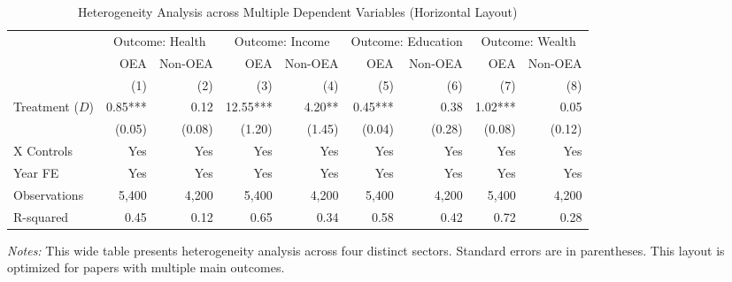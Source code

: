 \documentclass{article}
\begin{document}
\begin{landscape}
\begin{table}[htbp]
    \centering
    \begin{threeparttable}
    \caption{Heterogeneity Analysis across Multiple Dependent Variables (Horizontal Layout)}
    \label{tab:wide_results}
    \begin{tabular}{l r r r r r r r r}
        \toprule
        & \multicolumn{2}{c}{Outcome: Health} & \multicolumn{2}{c}{Outcome: Income} & \multicolumn{2}{c}{Outcome: Education} & \multicolumn{2}{c}{Outcome: Wealth} \\
        \cmidrule(lr){2-3} \cmidrule(lr){4-5} \cmidrule(lr){6-7} \cmidrule(lr){8-9}
        & {OEA} & {Non-OEA} & {OEA} & {Non-OEA} & {OEA} & {Non-OEA} & {OEA} & {Non-OEA} \\
        & {(1)} & {(2)} & {(3)} & {(4)} & {(5)} & {(6)} & {(7)} & {(8)} \\
        \midrule
        Treatment ($D$) & 0.85*** & 0.12 & 12.55*** & 4.20** & 0.45*** & 0.38 & 1.02*** & 0.05 \\
                        & (0.05) & (0.08) & (1.20) & (1.45) & (0.04) & (0.28) & (0.08) & (0.12) \\
        \addlinespace
        X Controls      & {Yes} & {Yes} & {Yes} & {Yes} & {Yes} & {Yes} & {Yes} & {Yes} \\
        Year FE         & {Yes} & {Yes} & {Yes} & {Yes} & {Yes} & {Yes} & {Yes} & {Yes} \\
        \midrule
        Observations    & {5,400} & {4,200} & {5,400} & {4,200} & {5,400} & {4,200} & {5,400} & {4,200} \\
        R-squared       & 0.45 & 0.12 & 0.65 & 0.34 & 0.58 & 0.42 & 0.72 & 0.28 \\
        \bottomrule
    \end{tabular}
    \begin{tablenotes}
        \small
        \item \textit{Notes:} This wide table presents heterogeneity analysis across four distinct sectors. Standard errors are in parentheses. This layout is optimized for papers with multiple main outcomes.
    \end{tablenotes}
    \end{threeparttable}
\end{table}
\end{landscape}
\end{document}
